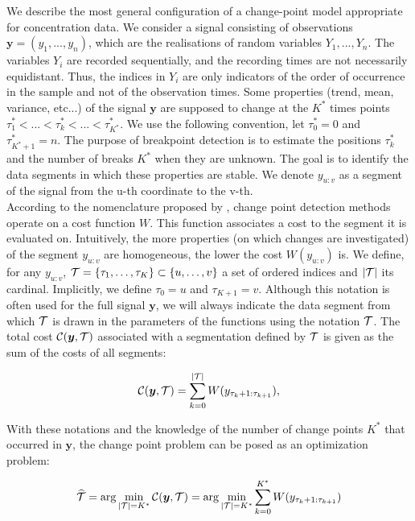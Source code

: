 We describe the most general configuration of a change-point model appropriate for concentration data. We consider a signal consisting of observations $\bm y = (y_1,...,y_n)$, which are the realisations of random variables $Y_1,...,Y_n$. The variables $Y_i$ are recorded sequentially, and the recording times are not necessarily equidistant. Thus, the indices in $Y_i$ are only indicators of the order of occurrence in the sample and not of the observation times. Some properties (trend, mean, variance, etc...) of the signal $\bm y$ are supposed to change at the $K^*$ times points $\tau^*_1 <... < \tau^*_k <... < \tau^*_{K^*}$. We use the following convention, let $\tau^*_0 = 0$ and $\tau^*_{K^*+1} = n$. The purpose of breakpoint detection is to estimate the positions $\tau^*_k$ and the number of breaks $K^*$ when they are unknown. The goal is to identify the data segments in which these properties are stable. We denote $y_{u:v}$ as a segment of the signal from the u-th coordinate to the v-th. \\
According to the nomenclature proposed by \cite{truong2020}, change point detection methods operate on a cost function $W$. This function associates a cost to the segment it is evaluated on. Intuitively, the more properties (on which changes are investigated) of the segment $y_{u:v}$ are homogeneous, the lower the cost $W(y_{u:v})$ is. We define, for any $y_{u:v}$, ${\mathcal T} = \{\tau_1,\dots,\tau_K\} \subset \{u,\dots,v\}$ a set of ordered indices and $\lvert {\mathcal T} \rvert$ its cardinal. Implicitly, we define $\tau_0 = u$ and $\tau_{K+1} = v$. Although this notation is often used for the full signal $\bm y$, we will always indicate the data segment from which ${\mathcal T}$ is drawn in the parameters of the functions using the notation ${\mathcal T}$. The total cost ${\mathcal C}(\bm y,{\mathcal T})$ associated with a segmentation defined by ${\mathcal T}$ is given as the sum of the costs of all segments:

\begin{equation}\label{chp:3:costfunc}
{\mathcal C}(\bm y,{\mathcal T}) = \sum_{k=0}^{\lvert {\mathcal T} \rvert} W(y_{\tau_k+1:\tau_{k+1}}), 
\end{equation}     

With these notations and the knowledge of the number of change points $K^*$ that occurred in $\bm y$, the change point problem can be posed as an optimization problem:

\begin{equation}\label{chp:3:optKknown}
 \widehat{{\mathcal T}}  = \arg \min_{\lvert {\mathcal T} \rvert = K^*}  {\mathcal C}(\bm y, {\mathcal T}) = \arg \min_{\lvert {\mathcal T} \rvert = K^*} \sum_{k=0}^{K^*} W(y_{\tau_k+1:\tau_{k+1}})   
\end{equation}

